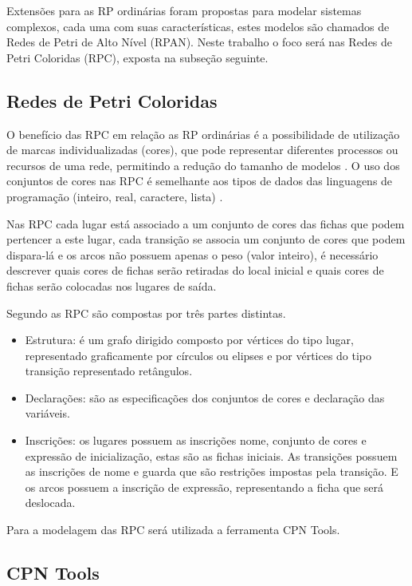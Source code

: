 Extensões para as RP ordinárias foram propostas para modelar sistemas complexos, cada uma com suas características, estes modelos são chamados de Redes de Petri de Alto Nível (RPAN). Neste trabalho o foco será nas Redes de Petri Coloridas (RPC), exposta na subseção seguinte.

\subsection{Redes de Petri Coloridas}

O benefício das RPC em relação as RP ordinárias é a possibilidade de utilização de marcas individualizadas (cores), que pode representar diferentes processos ou recursos de uma rede, permitindo a redução do tamanho de modelos \cite{maciel1996introduccao}. O uso dos conjuntos de cores nas RPC é semelhante aos tipos de dados das linguagens de programação (inteiro, real, caractere, lista) \cite{jensen2013coloured}.

Nas RPC cada lugar está associado a um conjunto de cores das fichas que podem pertencer a este lugar, cada transição se associa um conjunto de cores que podem dispara-lá e os arcos não possuem apenas o peso (valor inteiro), é necessário descrever quais cores de fichas serão retiradas do local inicial e quais cores de fichas serão colocadas nos lugares de saída.

Segundo \cite{maciel1996introduccao} as RPC são compostas por três partes distintas.

\begin{itemize}
\item Estrutura: é um grafo dirigido composto por vértices do tipo lugar, representado graficamente por círculos ou elipses e por vértices do tipo transição representado retângulos.
\item Declarações: são as especificações dos conjuntos de cores e declaração das variáveis.
\item Inscrições: os lugares possuem as inscrições nome, conjunto de cores e expressão de inicialização, estas são as fichas iniciais. As transições possuem as inscrições de nome e guarda que são restrições impostas pela transição. E os arcos possuem a inscrição de expressão, representando a ficha que será deslocada.
\end{itemize}

Para a modelagem das RPC será utilizada a ferramenta CPN Tools.

\subsection{CPN Tools}

